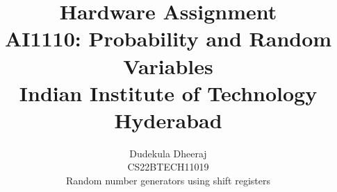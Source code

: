 \documentclass[12pt, journal]{IEEEtran}
\title{Hardware Assignment \\ \Large AI1110: Probability and Random Variables \\ \large Indian Institute of Technology Hyderabad}
\author{Dudekula Dheeraj \\ \normalsize CS22BTECH11019 \\ \large Random number generators using shift registers}
\DeclareMathOperator*{\Res}{Res}
\begin{document}
	\newtheorem{theorem}{Theorem}[section]
	\newtheorem{problem}{Problem}
	\newtheorem{proposition}{Proposition}[section]
	\newtheorem{lemma}{Lemma}[section]
	\newtheorem{corollary}[theorem]{Corollary}
	\newtheorem{example}{Example}[section]
	\newtheorem{definition}[problem]{Definition}
	\newcommand{\BEQA}{\begin{eqnarray}}
	\newcommand{\EEQA}{\end{eqnarray}}
	\newcommand{\define}{\stackrel{\triangle}{=}}

	


	\providecommand{\mbf}{\mathbf}
	\providecommand{\pr}[1]{\ensuremath{\Pr\left(#1\right)}}
	\providecommand{\qfunc}[1]{\ensuremath{Q\left(#1\right)}}
	\providecommand{\sbrak}[1]{\ensuremath{{}\left[#1\right]}}
	\providecommand{\lsbrak}[1]{\ensuremath{{}\left[#1\right.}}
	\providecommand{\rsbrak}[1]{\ensuremath{{}\left.#1\right]}}
	\providecommand{\brak}[1]{\ensuremath{\left(#1\right)}}
	\providecommand{\lbrak}[1]{\ensuremath{\left(#1\right.}}
	\providecommand{\rbrak}[1]{\ensuremath{\left.#1\right)}}
	\providecommand{\cbrak}[1]{\ensuremath{\left\{#1\right\}}}
	\providecommand{\lcbrak}[1]{\ensuremath{\left\{#1\right.}}
	\providecommand{\rcbrak}[1]{\ensuremath{\left.#1\right\}}}
	\theoremstyle{remark}
	\newtheorem{rem}{Remark}
	\newcommand{\sgn}{\mathop{\mathrm{sgn}}}
	\providecommand{\abs}[1]{\left\vert#1\right\vert}
	\providecommand{\res}[1]{\Res\displaylimits_{#1}} 
	\providecommand{\norm}[1]{\left\lVert#1\right\rVert}
	\providecommand{\mtx}[1]{\mathbf{#1}}
	\providecommand{\mean}[1]{E\left[ #1 \right]}
	\providecommand{\fourier}{\overset{\mathcal{F}}{ \rightleftharpoons}}
	\providecommand{\system}{\overset{\mathcal{H}}{ \longleftrightarrow}}
	\newcommand{\solution}{\noindent \textbf{Solution: }}
	\newcommand{\cosec}{\,\text{cosec}\,}
	\providecommand{\dec}[2]{\ensuremath{\overset{#1}{\underset{#2}{\gtrless}}}}
	\newcommand{\myvec}[1]{\ensuremath{\begin{pmatrix}#1\end{pmatrix}}}
	\newcommand{\mydet}[1]{\ensuremath{\begin{vmatrix}#1\end{vmatrix}}}
	
\end{document}
